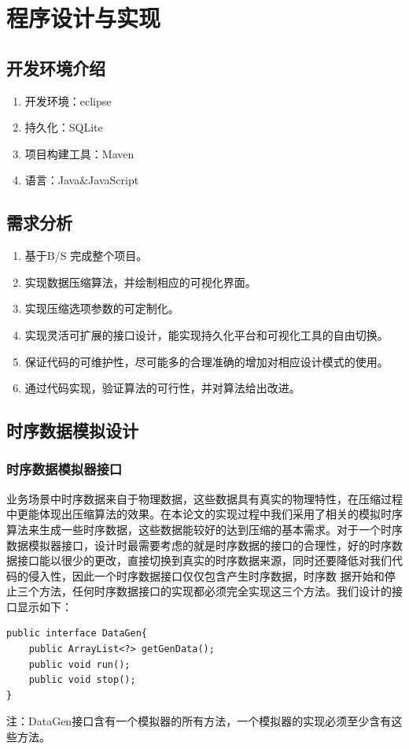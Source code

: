
\chapter{程序设计与实现}
\label{Chapter 4}

\section{开发环境介绍}
\label{4.1}
\begin{enumerate}[(1)]
	\item 开发环境：eclipse
	\item 持久化：SQLite
	\item 项目构建工具：Maven
	\item 语言：Java\&JavaScript
\end{enumerate}

\section{需求分析}
\label{4.2}
\begin{enumerate}[(1)]
	\item 基于B/S 完成整个项目。
	\item 实现数据压缩算法，并绘制相应的可视化界面。
	\item 实现压缩选项参数的可定制化。
	\item 实现灵活可扩展的接口设计，能实现持久化平台和可视化工具的自由切换。
	\item 保证代码的可维护性，尽可能多的合理准确的增加对相应设计模式的使用。
	\item 通过代码实现，验证算法的可行性，并对算法给出改进。
\end{enumerate}

\section{时序数据模拟设计}
\label{4.3}
\subsection{时序数据模拟器接口}
业务场景中时序数据来自于物理数据，这些数据具有真实的物理特性，在压缩过程中更能体现出压缩算法的效果。在本论文的实现过程中我们采用了相关的模拟时序
算法来生成一些时序数据，这些数据能较好的达到压缩的基本需求。对于一个时序数据模拟器接口，设计时最需要考虑的就是时序数据的接口的合理性，好的时序数据接口能以很少的更改，直接切换到真实的时序数据来源，同时还要降低对我们代码的侵入性，因此一个时序数据接口仅仅包含产生时序数据，时序数
据开始和停止三个方法，任何时序数据接口的实现都必须完全实现这三个方法。我们设计的接口显示如下：
\begin{lstlisting}
public interface DataGen{
	public ArrayList<?> getGenData();
	public void run();
	public void stop();
}
\end{lstlisting}
注：DataGen接口含有一个模拟器的所有方法，一个模拟器的实现必须至少含有这些方法。



